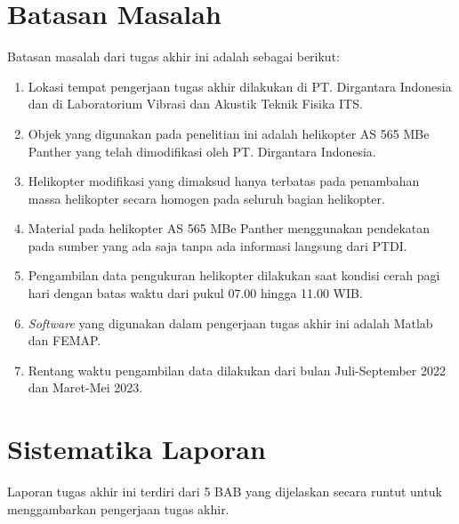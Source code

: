 \section{Batasan Masalah}
\label{sec:batasanmasalah}

Batasan masalah dari tugas akhir ini adalah sebagai berikut:

\begin{enumerate}[nolistsep]

  \item Lokasi tempat pengerjaan tugas akhir dilakukan di PT. Dirgantara Indonesia dan di Laboratorium Vibrasi dan Akustik Teknik Fisika ITS.

  \item Objek yang digunakan pada penelitian ini adalah helikopter AS 565 MBe Panther yang telah dimodifikasi oleh PT. Dirgantara Indonesia.
  
  \item Helikopter modifikasi yang dimaksud hanya terbatas pada penambahan massa helikopter secara homogen pada seluruh bagian helikopter.
  
  \item Material pada helikopter AS 565 MBe Panther menggunakan pendekatan pada sumber yang ada saja tanpa ada informasi langsung dari PTDI.

  \item Pengambilan data pengukuran helikopter dilakukan saat kondisi cerah pagi hari dengan batas waktu dari pukul 07.00 hingga 11.00 WIB.
  
  \item \textit{Software} yang digunakan dalam pengerjaan tugas akhir ini adalah Matlab dan FEMAP.
  
  \item Rentang waktu pengambilan data dilakukan dari bulan Juli-September 2022 dan Maret-Mei 2023.

\end{enumerate}

\section{Sistematika Laporan}
\label{sec:sistematikalaporan}

Laporan tugas akhir ini terdiri dari 5 BAB yang dijelaskan secara runtut untuk menggambarkan pengerjaan tugas akhir.

